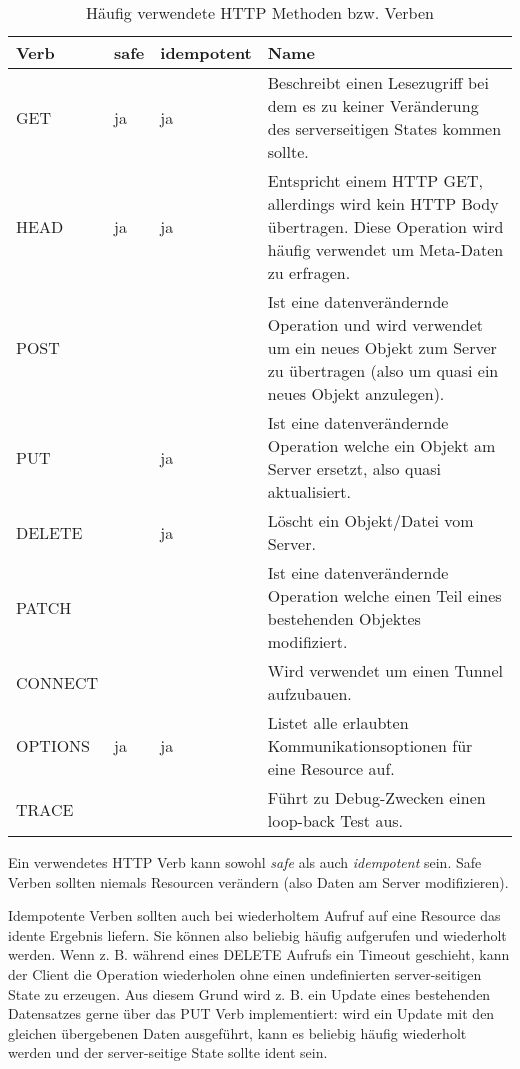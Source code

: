 \begin{table}
	\begin{center}
\begin{tabular}{lllp{6cm}}
	\toprule
	Verb & safe & idempotent & Name\\
	\midrule
	GET  & ja & ja & Beschreibt einen Lesezugriff bei dem es zu keiner Veränderung des serverseitigen States kommen sollte. \\
	HEAD & ja & ja &  Entspricht einem HTTP GET, allerdings wird kein HTTP Body übertragen. Diese Operation wird häufig verwendet um Meta-Daten zu erfragen.\\
	POST &    &    & Ist eine datenverändernde Operation und wird verwendet um ein neues Objekt zum Server zu übertragen (also um quasi ein neues Objekt anzulegen).\\
	PUT  &    & ja & Ist eine datenverändernde Operation welche ein Objekt am Server ersetzt, also quasi aktualisiert. \\
	DELETE &  & ja & Löscht ein Objekt/Datei vom Server. \\
	PATCH &   &    & Ist eine datenverändernde Operation welche einen Teil eines bestehenden Objektes modifiziert. \\
	CONNECT & &    & Wird verwendet um einen Tunnel aufzubauen. \\
	OPTIONS & ja & ja & Listet alle erlaubten Kommunikationsoptionen für eine Resource auf. \\
	TRACE &   &    & Führt zu Debug-Zwecken einen loop-back Test aus. \\
	\bottomrule
\end{tabular}
	\caption{Häufig verwendete HTTP Methoden bzw. Verben}
	\label{tbl:http_verbs}
\end{center}
\end{table}

Ein verwendetes HTTP Verb kann sowohl \textit{safe} als auch \textit{idempotent} sein. Safe Verben sollten niemals Resourcen verändern (also Daten am Server modifizieren).

Idempotente Verben sollten auch bei wiederholtem Aufruf auf eine Resource das idente Ergebnis liefern. Sie können also beliebig häufig aufgerufen und wiederholt werden. Wenn z. B. während eines DELETE Aufrufs ein Timeout geschieht, kann der Client die Operation wiederholen ohne einen undefinierten server-seitigen State zu erzeugen. Aus diesem Grund wird z. B. ein Update eines bestehenden Datensatzes gerne über das PUT Verb implementiert: wird ein Update mit den gleichen übergebenen Daten ausgeführt, kann es beliebig häufig wiederholt werden und der server-seitige State sollte ident sein.

